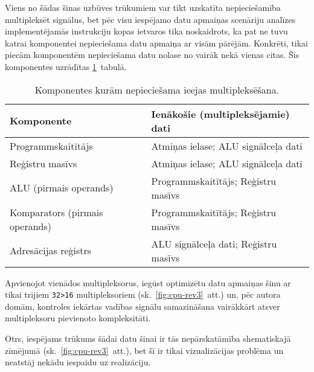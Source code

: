Viens no šādas šinas uzbūves trūkumiem var tikt uzskatīta nepieciešamība
multipleksēt signālus, bet pēc visu iespējamo datu apmaiņas scenāriju analīzes
implementējamās instrukciju kopas ietvaros tika noskaidrots, ka pat ne tuvu 
katrai komponentei nepieciešama datu apmaiņa ar visām pārējām.
Konkrēti, tikai piecām komponentēm nepieciešama datu nolase no vairāk
nekā vienas citas. Šīs komponentes uzrādītas \ref{tbl:muxes}~tabulā.
\begin{table}[thb]
	\centering
	\caption{Komponentes kurām nepieciešama ieejas multipleksēšana.}
	\label{tbl:muxes}
	\begin{tabular}{ll}
		\toprule
		Komponente & Ienākošie (multipleksējamie) dati\\ 
		\midrule
		Programmskaitītājs & Atmiņas ielase; ALU signālceļa dati\\
		Reģistru masīvs & Atmiņas ielase; ALU signālceļa dati\\
		ALU (pirmais operands) & Programmskaitītājs; Reģistru masīvs\\
		Komparators (pirmais operands) & Programmskaitītājs; Reģistru masīvs\\
		Adresācijas reģistrs & ALU signālceļa dati; Reģistru masīvs\\
		\bottomrule
	\end{tabular}
\end{table}
Apvienojot vienādos multipleksorus, iegūst optimizētu datu apmaiņas šinu
ar tikai trijiem \texttt{32>16} multipleksoriem (sk.~\ref{fig:cpu-rev3}~att.)
un, pēc autora domām, kontroles iekārtas vadības signālu samazināšana vairākkārt
atsver multipleksoru pievienoto kompleksitāti.

Otrs, iespējams trūkums šādai datu šinai ir tās nepārskatāmība shematiskajā
zīmējumā (sk.~\ref{fig:cpu-rev3}~att.), bet šī ir tikai vizualizācijas
problēma un neatstāj nekādu iespaidu uz realizāciju.


